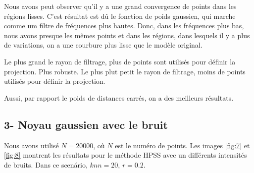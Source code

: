 \documentclass[a4,12pt]{report}
\begin{document}
Nous avons peut observer qu'il y a une grand convergence de points dans les régions lisses. C'est résultat est dû le fonction de poids gaussien, qui marche comme um filtre de fréquences plus hautes. Donc, dans les fréquences plus bas, nous avons presque les mêmes points et dans les régions, dans lesquels il y a plus de variations, on a une courbure plus lisse que le modèle original.


Le plus grand le rayon de filtrage, plus de points sont utilisés pour définir la projection. Plus robuste.
Le plus plut petit le rayon de filtrage, moins de points utilisés pour définir la projection. 

Aussi, par rapport le poids de distances carrés, on a des meilleurs résultats.

\subsection*{3- Noyau gaussien avec le bruit}
Nous avons utilisé $N=20000$, où $N$ est le numéro de points. Les images \ref{fig:7} et \ref{fig:8} montrent les résultats pour le méthode HPSS avec un différents intensités de bruits. Dans ce scenário, $knn=20$, $r=0.2$.
\end{document}
